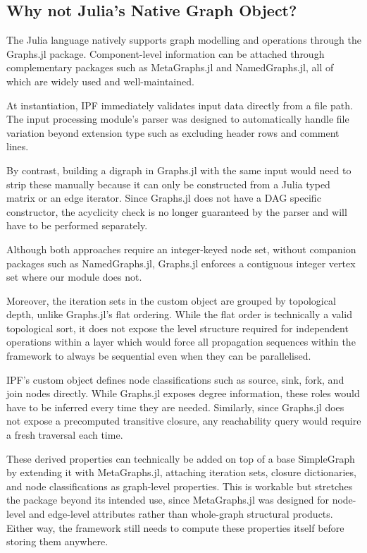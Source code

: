 \documentclass[12pt]{report}
\begin{document}
\subsection{Why not Julia's Native Graph Object?}

The Julia language natively supports graph modelling and operations through the Graphs.jl package. Component-level information can be attached through complementary packages such as MetaGraphs.jl and NamedGraphs.jl, all of which are widely used and well-maintained.

At instantiation, IPF immediately validates input data directly from a file path. The input processing module's parser was designed to automatically handle file variation beyond extension type such as excluding header rows and comment lines.

By contrast, building a digraph in Graphs.jl with the same input would need to strip these manually because it can only be constructed from a Julia typed matrix or an edge iterator. Since Graphs.jl does not have a DAG specific constructor, the acyclicity check is no longer guaranteed by the parser and will have to be performed separately.

Although both approaches require an integer-keyed node set, without companion packages such as NamedGraphs.jl, Graphs.jl enforces a contiguous integer vertex set where our module does not.

Moreover, the iteration sets in the custom object are grouped by topological depth, unlike Graphs.jl's flat ordering. While the flat order is technically a valid topological sort, it does not expose the level structure required for independent operations within a layer which would force all propagation sequences within the framework to always be sequential even when they can be parallelised.

IPF's custom object defines node classifications such as source, sink, fork, and join nodes directly. While Graphs.jl exposes degree information, these roles would have to be inferred every time they are needed. Similarly, since Graphs.jl does not expose a precomputed transitive closure, any reachability query would require a fresh traversal each time.

These derived properties can technically be added on top of a base SimpleGraph by extending it with MetaGraphs.jl, attaching iteration sets, closure dictionaries, and node classifications as graph-level properties. This is workable but stretches the package beyond its intended use, since MetaGraphs.jl was designed for node-level and edge-level attributes rather than whole-graph structural products. Either way, the framework still needs to compute these properties itself before storing them anywhere.
\end{document}
